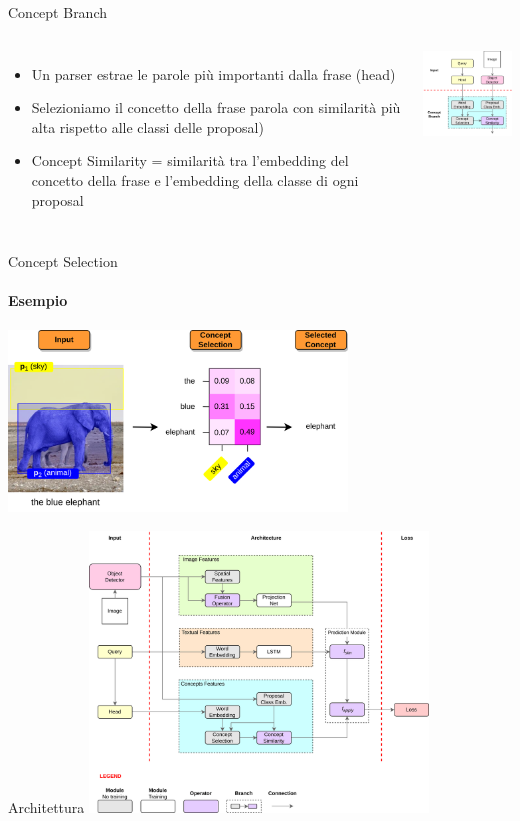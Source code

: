 \documentclass{beamer}
\begin{document}
\begin{frame}{Concept Branch}
  \begin{columns}
      \begin{itemize}
        \item Un parser estrae le parole più importanti dalla frase (\alert{head})
        \item Selezioniamo il \alert{concetto} della frase parola con
        similarità più alta rispetto alle classi delle proposal)
        \vspace{0.5cm}
        \item Concept Similarity = similarità tra \alert{l'embedding del
        concetto} della frase e \alert{l'embedding della classe} di ogni
        proposal
      \end{itemize}
      \centering
      \includegraphics[width=4.5cm]{images/concept-branch.png}
  \end{columns}
\end{frame}

\begin{frame}{Concept Selection}
  \framesubtitle{Esempio}
  \centering
  \includegraphics[width=9cm]{images/concept-selection-example.png}
\end{frame}

\begin{frame}{Architettura}
  \centering
  \includegraphics[width=9cm]{images/model-architecture.png}
\end{frame}
\end{document}
